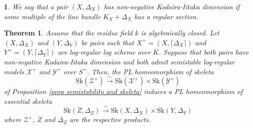 \documentclass{amsart}%
\numberwithin{equation}{subsection}
\theoremstyle{plain2}
\newtheorem{theorem}[equation]{Theorem}
\theoremstyle{definition2}
\theoremstyle{stepstyle}
\theoremstyle{point}
\theoremstyle{subpoint}
\newtheorem{subpoint}[equation]{}%
\newcommand{\spa}[1]{\begin{subpoint}#1\end{subpoint}}           %
\newcommand{\cX}{\ensuremath{\mathscr{X}}}
\newcommand{\cY}{\ensuremath{\mathscr{Y}}}
\newcommand{\cZ}{\ensuremath{\mathscr{Z}}}
\renewcommand{\cY}{\ensuremath{\mathscr{Y}}}
\newcommand{\Sk}{\mathrm{Sk}}
\begin{document}
\spa{We say that a pair $(X,\Delta_X)$ has non-negative Kodaira-Iitaka dimension if some multiple of the line bundle $K_X + \Delta_X$ has a regular section.}
\begin{theorem} \label{thm essential skeleton of product via log-reg}
Assume that the residue field $k$ is algebraically closed. Let $(X,\Delta_X)$ and $(Y,\Delta_Y)$ be pairs such that $X^+=(X,\lceil \Delta_X \rceil)$ and $Y^+=(Y, \lceil \Delta_Y\rceil)$ are log-regular log scheme over $K$. Suppose that both pairs have non-negative Kodaira-Iitaka dimension and both admit semistable log-regular models $\cX^+$ and $\cY^+$ over $S^+$. Then, the PL homeomorphism of skeleta $$\Sk(\cZ^+) \xrightarrow{\sim} \Sk(\cX^+) \times \Sk(\cY^+)$$of Proposition \ref{prop semistability and skeleta} induces a PL homeomorphism of essential skeleta $$\Sk(Z,\Delta_Z) \xrightarrow{\sim} \Sk(X,\Delta_X) \times \Sk(Y,\Delta_Y)$$ where $\cZ^+$, $Z$ and $\Delta_Z$ are the respective products. 
\end{theorem}
\end{document}
